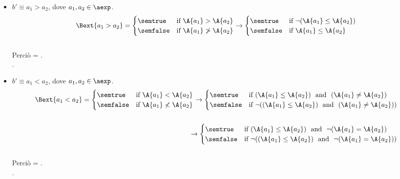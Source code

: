 {\begin{enumerate}[label=(\alph*)]
\begin{itemize}
    \item $ b' \equiv a_1 > a_2$, dove $a_1, a_2 \in \aexp$. \\
      \begin{align*} 
       \Bext{a_1 > a_2} = 
        \begin{cases} 
        \semtrue & 
        \mbox{if} \ \A{a_1} > \A{a_2}\\ 
        \semfalse & 
        \mbox{if} \ \A{a_1} \not > \A{a_2}\\
        \end{cases} 
        \rightarrow
        \begin{cases} 
        \semtrue & 
        \mbox{if} \ \lnot (\A{a_1} \leq \A{a_2})\\ 
        \semfalse & 
        \mbox{if} \ \A{a_1} \leq \A{a_2}\\
        \end{cases} 
      \end{align*} \\
      Perciò  = . \\.

    \item $ b' \equiv a_1 < a_2$, dove $a_1, a_2 \in \aexp$. \\
      \begin{align*}
        \Bext{a_1 < a_2} = 
        \begin{cases} 
        \semtrue & 
        \mbox{if} \ \A{a_1} < \A{a_2}\\ 
        \semfalse & 
        \mbox{if} \ \A{a_1} \not < \A{a_2}\\
        \end{cases}
        \rightarrow
        \begin{cases} 
        \semtrue & 
        \mbox{if} \ (\A{a_1} \leq \A{a_2}) \ \mbox{ and } \ (\A{a_1} \not =  \A{a_2})\\ 
        \semfalse & 
        \mbox{if} \ \lnot ((\A{a_1} \leq \A{a_2}) \ \mbox{ and } \ (\A{a_1} \not =  \A{a_2}))\\
        \end{cases} \\ \\
        \rightarrow
        \begin{cases} 
        \semtrue & 
        \mbox{if} \ (\A{a_1} \leq \A{a_2}) \ \mbox{ and } \ \lnot (\A{a_1} =  \A{a_2})\\ 
        \semfalse & 
        \mbox{if} \ \lnot ((\A{a_1} \leq \A{a_2}) \ \mbox{ and } \ \lnot (\A{a_1} = \A{a_2}))\\
        \end{cases}
      \end{align*} \\
      Perciò  =
      . \\.


\end{itemize}
\end{enumerate}}

